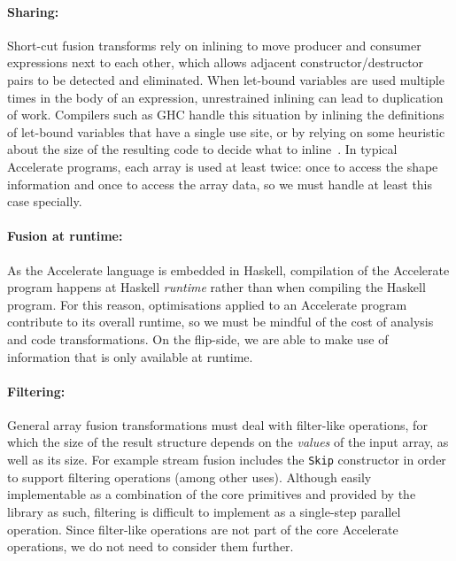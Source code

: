 \paragraph{Sharing:} Short-cut fusion transforms rely on
inlining to move producer and consumer expressions next to each other, which
allows adjacent constructor/destructor pairs to be detected and eliminated. When
let-bound variables are used multiple times in the body of an expression,
unrestrained inlining can lead to duplication of work. Compilers such as GHC
handle this situation by inlining the definitions of let-bound variables that
have a single use site, or by relying on some heuristic about the size of the
resulting code to decide what to inline~\cite{PeytonJones:2003gb}. In typical
Accelerate programs, each array is used at least twice: once to access the shape
information and once to access the array data, so we must handle at least this
case specially.

\paragraph{Fusion at runtime:} As the Accelerate language is embedded in
Haskell, compilation of the Accelerate program happens at Haskell
\emph{runtime} rather than when compiling the Haskell program. For this reason,
optimisations applied to an Accelerate program contribute to its overall
runtime, so we must be mindful of the cost of analysis and code transformations.
On the flip-side, we are able to make use of information that is only available
at runtime.

\paragraph{Filtering:} General array fusion transformations must deal with
filter-like operations, for which the size of the result structure depends on
the \emph{values} of the input array, as well as its size. For example
stream fusion includes the \texttt{Skip} constructor in
order to support filtering operations (among other uses). Although easily
implementable as a combination of the core primitives and provided by the
library as such, filtering is difficult to implement as a single-step parallel
operation. Since filter-like operations are not part of the core Accelerate
operations, we do not need to consider them further.

%


